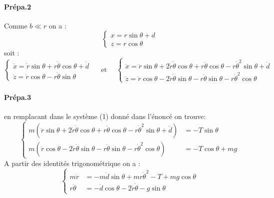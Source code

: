 \documentclass[10pt,a4paper,notitlepage]{article}
\begin{document}
\paragraph{Prépa.2}
Comme $b\ll r$ on a :
\begin{equation}
  \begin{cases}
    x = r\sin\theta+d\\
    z = r\cos\theta
  \end{cases}
\end{equation}
soit :
\begin{equation}
  \begin{cases}
    \dot{x} = \dot{r}\sin\theta + r\dot{\theta}\cos\theta +\dot{d}\\
    \dot{z} = \dot{r}\cos\theta -r\dot{\theta}\sin\theta
  \end{cases}
  \quad\text{ et }\quad
  \begin{cases}
    \ddot{x} = \ddot{r}\sin\theta+2\dot{r}\dot{\theta}\cos\theta+r\ddot{\theta}\cos\theta- r\dot{\theta}^2\sin\theta+\ddot{d}\\
    \ddot{z} = \ddot{r}\cos\theta-2\dot{r}\dot{\theta}\sin\theta-r\ddot{\theta}\sin\theta-r\dot{\theta}^2\cos\theta
  \end{cases}
\end{equation}
\paragraph{Prépa.3} en remplacant dans le système (1) donné dans l'énoncé on trouve:
\begin{equation}
  \begin{cases}
    m(
    \ddot{r} \sin\theta+2\dot{r}\dot{\theta}\cos\theta+r\ddot{\theta}\cos\theta-r\dot{\theta}^2\sin\theta+\ddot{d}
    ) &=-T\sin\theta\\
    m(
    \ddot{r}\cos{\theta}-2\dot{r}\dot{\theta}\sin\theta-r\ddot{\theta}\sin\theta-r\dot{\theta}^2\cos\theta
    ) &= - T\cos\theta+ mg
  \end{cases}
\end{equation}
A partir des identités trigonométrique on a :
\begin{equation}
  \begin{cases}
    m\ddot{r} &= - m\ddot{d}\sin\theta+mr\dot{\theta}^2 -T + mg \cos{\theta}\\
    r \ddot{\theta} &= -\ddot{d}\cos\theta-2\dot{r}\dot{\theta}-g\sin\theta 
  \end{cases}
\end{equation}
\end{document}

